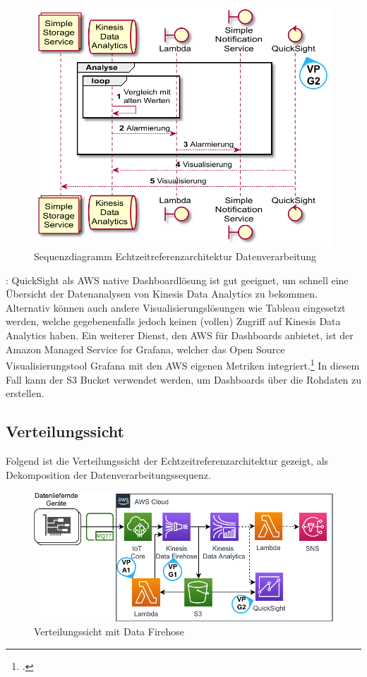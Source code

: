 \begin{figure}[H]
\centering
\includegraphics[height=0.43\textheight]{graphics/echtzeit-ra-analysis.pdf}
\caption{Sequenzdiagramm Echtzeitreferenzarchitektur Datenverarbeitung}
\label{abb:SequenceEchtzeitRAAnalysis}
\end{figure}

: QuickSight als \ac{AWS} native Dashboardlösung ist gut geeignet, um schnell eine Übersicht der Datenanalysen von Kinesis Data Analytics zu bekommen. Alternativ können auch andere Visualisierungslösungen wie Tableau eingesetzt werden, welche gegebenenfalls jedoch keinen (vollen) Zugriff auf Kinesis Data Analytics haben. Ein weiterer Dienst, den \ac{AWS} für Dashboards anbietet, ist der Amazon Managed Service for Grafana, welcher das Open Source Visualisierungstool Grafana mit den \ac{AWS} eigenen Metriken integriert.\footcite[Vgl.][]{Dutt.2020} In diesem Fall kann der \ac{S3} Bucket verwendet werden, um Dashboards über die Rohdaten zu erstellen. 

\subsection{Verteilungssicht}
Folgend ist die Verteilungssicht der Echtzeitreferenzarchitektur gezeigt, als Dekomposition der Datenverarbeitungssequenz.
\begin{figure}[H]
\centering
\includegraphics[width=\textwidth]{graphics/Echtzeit-RA-Overview-Firehose}
\caption{Verteilungssicht mit Data Firehose}
\label{abb:TopLevelEchtzeitRA}
\end{figure}

